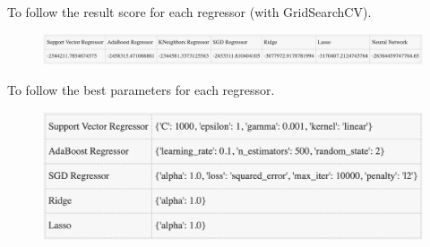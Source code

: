 \documentclass[a4paper,10pt]{report}
\begin{document}
To follow the result score for each regressor (with GridSearchCV).
\begin{figure}[H]
    \centering
    \includegraphics[width = 500pt]{img/table.png}
  \end{figure}
To follow the best parameters for each regressor.
\begin{figure}[H]
    \centering
    \includegraphics[width = 500pt]{img/regrparams.png}
  \end{figure}
\end{document}
